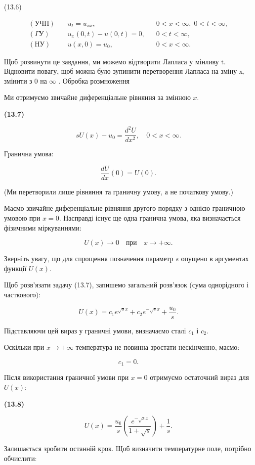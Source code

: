 \documentclass[
  ukrainian,
]{article}
\begin{document}
(13.6)

\[
\begin{aligned}
(\text{УЧП})\quad & u_t = u_{xx}, && 0 < x < \infty,\; 0 < t < \infty, \\
(\Gamma \text{У})\quad & u_x(0,t) - u(0,t) = 0, && 0 < t < \infty, \\
(\text{НУ})\quad & u(x,0) = u_0, && 0 < x < \infty.
\end{aligned}
\]

Щоб розвинути це завдання, ми можемо відтворити Лапласа у мінливу t.
Відновити повагу, щоб можна було зупинити перетворення Лапласа на зміну
x, змінити з 0 на \(\infty\) . Обробка розмноження

Ми отримуємо звичайне диференціальне рівняння за змінною \(x\).

\textbf{(13.7)}

\[
sU(x) - u_0 = \frac{d^2U}{dx^2}, \quad 0 < x < \infty.
\]

Гранична умова:

\[
\frac{dU}{dx}(0) = U(0).
\]

(Ми перетворили лише рівняння та граничну умову, а не початкову умову.)

Маємо звичайне диференціальне рівняння другого порядку з однією
граничною умовою при \(x=0\). Насправді існує ще одна гранична умова,
яка визначається фізичними міркуваннями:

\[
U(x) \to 0 \quad \text{при} \quad x \to +\infty.
\]

Зверніть увагу, що для спрощення позначення параметр \(s\) опущено в
аргументах функції \(U(x)\).

Щоб розв'язати задачу (13.7), запишемо загальний розв'язок (сума
однорідного і часткового):

\[
U(x) = c_1 e^{\sqrt{s}x} + c_2 e^{-\sqrt{s}x} + \frac{u_0}{s}.
\]

Підставляючи цей вираз у граничні умови, визначаємо сталі \(c_1\) і
\(c_2\).

Оскільки при \(x \to +\infty\) температура не повинна зростати
нескінченно, маємо:

\[
c_1 = 0.
\]

Після використання граничної умови при \(x=0\) отримуємо остаточний
вираз для \(U(x)\):

\textbf{(13.8)}

\[
U(x) = \frac{u_0}{s} \left( \frac{e^{-\sqrt{s}x}}{1 + \sqrt{s}} \right) + \frac{1}{s}.
\]

Залишається зробити останній крок. Щоб визначити температурне поле,
потрібно обчислити:
\end{document}
